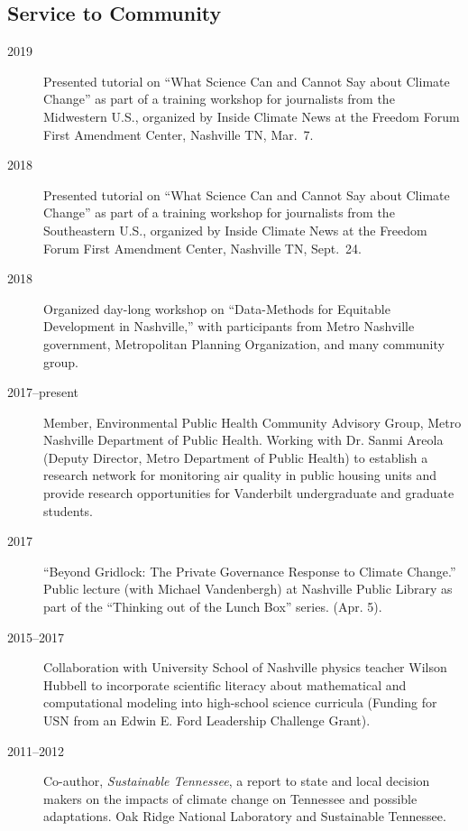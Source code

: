 \documentclass[10pt]{article}
\begin{document}
	\subsection{Service to Community}
    	\begin{description}
            \item[2019] Presented tutorial on ``What Science Can and Cannot Say about Climate Change'' as part of a training workshop for journalists from the Midwestern U.S., organized by Inside Climate News at the Freedom Forum First Amendment Center, Nashville TN, Mar.~7.
            \item[2018] Presented tutorial on ``What Science Can and Cannot Say about Climate Change'' as part of a training workshop for journalists from the Southeastern U.S., organized by Inside Climate News at the Freedom Forum First Amendment Center, Nashville TN, Sept.~24.
    		\item[2018] Organized day-long workshop on ``Data-Methods for Equitable Development in Nashville,'' with participants from Metro Nashville government, Metropolitan Planning Organization,
    		and many community group.
            \item[2017--present] Member, Environmental Public Health Community Advisory Group, Metro Nashville Department of Public Health. Working with Dr. Sanmi Areola (Deputy Director, Metro Department of Public Health)
            to establish a research network for monitoring air quality in public housing units and provide research opportunities for Vanderbilt undergraduate and graduate students.
            \item[2017] ``Beyond Gridlock: The Private Governance Response to Climate Change.'' Public lecture (with Michael Vandenbergh) at Nashville Public Library as part of the ``Thinking out of the Lunch Box'' series. (Apr. 5).
        	\item[2015--2017] Collaboration with University School of Nashville physics teacher Wilson Hubbell to incorporate scientific literacy about mathematical and computational modeling into high-school science curricula (Funding for USN from an Edwin E. Ford Leadership Challenge Grant).
    		\item[2011--2012] Co-author, \emph{Sustainable Tennessee}, a report to state and local decision makers on the impacts of climate change on Tennessee and possible adaptations. Oak Ridge National Laboratory and Sustainable Tennessee.

\end{description}
\end{document}
